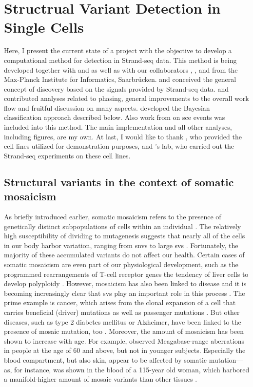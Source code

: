 \chapter{Structrual Variant Detection in Single Cells}
\label{sec:mosaicatcher}

Here, I present the current state of a project with the objective to develop a
computational method for \sv detection in Strand-seq data. This method is being
developed together with \jan and \ashley as well as with our collaborators
\david, \maryam, and \marschall from the Max-Planck Institute for Informatics,
Saarbrücken. \ashley and \jan conceived the general concept of \sv discovery
based on the signals provided by Strand-seq data. \marschall and \david
contributed analyses related to phasing, general improvements to the overall
work flow and fruitful discussion on many aspects. \maryam developed the
Bayesian classification approach described below. Also work from \venla on
\acl{sce} events was included into this method.
The main implementation and all other analyses, including figures, are my own.
At last, I would like to thank \balca, who provided the cell lines utilized for
demonstration purposes, and \landsdorp's lab, who carried out the Strand-seq
experiments on these cell lines.





\section{Structural variants in the context of somatic mosaicism}
\label{sec:mosaic_mosaicism}

As briefly introduced earlier, somatic mosaicism refers to the presence of
genetically distinct subpopulations of cells within an individual
\citep{Youssoufian2002}. The relatively high susceptibility of dividing to mutagenesis
suggests that nearly all of the cells in our body harbor variation, ranging from \acp{snv}
to large \acp{sv} \citep{Campbell2015}. Fortunately, the majority of these
accumulated variants do not affect our health. Certain cases of somatic mosaicism are even
part of our physiological development, such as the programmed rearrangements of
T-cell receptor genes the tendency of liver cells to develop polyploidy
\citep{Forsberg2017,Davoli2011}. However, mosaicism has also been linked to
disease and it is becoming increasingly clear that \aclp{sv} play an important
role in this process \citep{Forsberg2017}. The prime example is cancer, which
arises from the clonal expansion of a cell that carries beneficial (driver)
mutations as well as passenger mutations \citep{Forsberg2017}. But other
diseases, such as type 2 diabetes mellitus or Alzheimer, have been linked to the
presence of mosaic mutation, too \citep{Forsberg2017}. Moreover, the amount of
mosaicism has been shown to increase with age. For example, \cite{Forsberg2012}
observed Meagabase-range aberrations in people at the age of 60 and above, but not in
younger subjects. Especially the blood compartment, but also skin, appear to be
affected by somatic mutation---as, for instance, was shown in the blood of a
115-year old woman, which harbored a manifold-higher amount of mosaic variants
than other tissues \citep{Forsberg2017,Holstege2014}.


